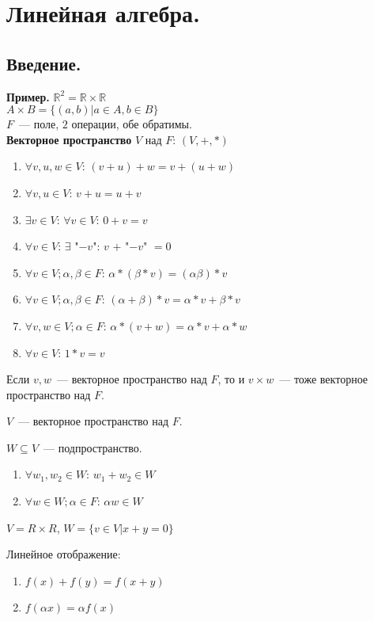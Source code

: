 \documentclass{article}
\begin{document}
	\tableofcontents
	\setcounter{tocdepth}{3}
	\newpage
	\section{Линейная алгебра.}
	\subsection{Введение.}
	\textbf{Пример.} $\mathbb{R}^2 = \mathbb{R} \times \mathbb{R}$ \\
	$A \times B = \{ (a, b) | a \in A, b \in B \}$ \\
	$F$~--- поле, $2$ операции, обе обратимы. \\
	\textbf{Векторное пространство} $V$ над $F$: $(V, +, *)$
	\begin{enumerate}
		\item $\forall v, u, w \in V$: $(v + u) + w = v + (u + w)$
		\item $\forall v, u \in V$: $v + u = u + v$
		\item $\exists v \in V$: $\forall v \in V$: $0 + v = v$
		\item $\forall v \in V$: $\exists$ "$-v$": $v$ $+$ "$-v$" $= 0$
		\item $\forall v \in V; \alpha, \beta \in F$: $\alpha * (\beta * v) = (\alpha \beta) * v$
		\item $\forall v \in V; \alpha, \beta \in F$: $(\alpha + \beta) * v = \alpha * v + \beta * v$
		\item $\forall v, w \in V; \alpha \in F$: $\alpha * (v + w) = \alpha * v + \alpha * w$
		\item $\forall v \in V$: $1 * v = v$
	\end{enumerate}
	\begin{statement}
		Если $v, w$~--- векторное пространство над $F$, то и $v \times w$~--- тоже векторное пространство над $F$.
	\end{statement}
	\noindent
	$V$~--- векторное пространство над $F$.
	\begin{definition}
		$W \subseteq V$~--- подпространство.
		\begin{enumerate}
			\item $\forall w_1, w_2 \in W$: $w_1 + w_2 \in W$
			\item $\forall w \in W; \alpha \in F$: $\alpha w \in W$
		\end{enumerate}
	\end{definition}
	\noindent
	$V = R \times R$, $W = \{ v \in V | x + y = 0 \}$
	\begin{definition}
		Линейное отображение:
		\begin{enumerate}
			\item $f(x) + f(y) = f(x + y)$
			\item $f(\alpha x) = \alpha f(x)$
		\end{enumerate}
	\end{definition} 
\end{document}

